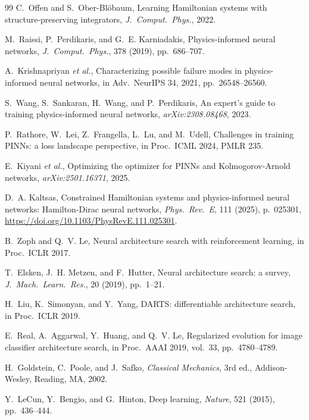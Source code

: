 \documentclass[11pt]{article}
\theoremstyle{definition}
\begin{document}
\begin{thebibliography}{99}
C.~Offen and S.~Ober-Bl\"{o}baum,
Learning Hamiltonian systems with structure-preserving integrators,
\textit{J.\ Comput.\ Phys.}, 2022.

M.~Raissi, P.~Perdikaris, and G.~E. Karniadakis,
Physics-informed neural networks,
\textit{J.\ Comput.\ Phys.}, 378 (2019), pp.~686--707.

A.~Krishnapriyan \textit{et al.},
Characterizing possible failure modes in physics-informed neural networks,
in Adv.\ NeurIPS 34, 2021, pp.~26548--26560.

S.~Wang, S.~Sankaran, H.~Wang, and P.~Perdikaris,
An expert's guide to training physics-informed neural networks,
\textit{arXiv:2308.08468}, 2023.

P.~Rathore, W.~Lei, Z.~Frangella, L.~Lu, and M.~Udell,
Challenges in training PINNs: a loss landscape perspective,
in Proc.\ ICML 2024, PMLR 235.

E.~Kiyani \textit{et al.},
Optimizing the optimizer for PINNs and Kolmogorov-Arnold networks,
\textit{arXiv:2501.16371}, 2025.

D.~A. Kaltsas,
Constrained Hamiltonian systems and physics-informed neural networks:
Hamilton-Dirac neural networks,
\textit{Phys.\ Rev.\ E}, 111 (2025), p.~025301,
\url{https://doi.org/10.1103/PhysRevE.111.025301}.

B.~Zoph and Q.~V. Le,
Neural architecture search with reinforcement learning,
in Proc.\ ICLR 2017.

T.~Elsken, J.~H. Metzen, and F.~Hutter,
Neural architecture search: a survey,
\textit{J.\ Mach.\ Learn.\ Res.}, 20 (2019), pp.~1--21.

H.~Liu, K.~Simonyan, and Y.~Yang,
DARTS: differentiable architecture search,
in Proc.\ ICLR 2019.

E.~Real, A.~Aggarwal, Y.~Huang, and Q.~V. Le,
Regularized evolution for image classifier architecture search,
in Proc.\ AAAI 2019, vol.~33, pp.~4780--4789.

H.~Goldstein, C.~Poole, and J.~Safko,
\textit{Classical Mechanics}, 3rd ed.,
Addison-Wesley, Reading, MA, 2002.

Y.~LeCun, Y.~Bengio, and G.~Hinton,
Deep learning,
\textit{Nature}, 521 (2015), pp.~436--444.


\end{thebibliography}
\end{document}
